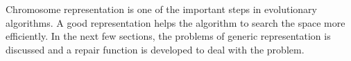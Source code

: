 \documentclass{article}
\begin{document}
Chromosome representation is one of the important steps in evolutionary algorithms. 
A good representation helps the algorithm to search the space more efficiently. 
In the next few sections, the problems of generic representation is discussed and a repair function is developed to deal with the problem.
%
%
%    
\end{document}
